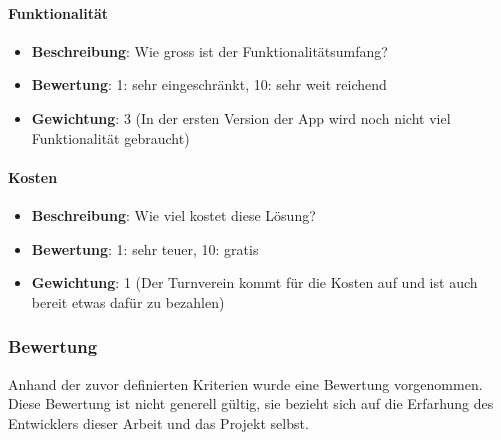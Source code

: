 \paragraph{Funktionalität}
\begin{itemize}
	\item \textbf{Beschreibung}: Wie gross ist der Funktionalitätsumfang? 
	\item \textbf{Bewertung}: 1: sehr eingeschränkt, 10: sehr weit reichend
	\item \textbf{Gewichtung}: 3 (In der ersten Version der App wird noch nicht viel Funktionalität gebraucht)
\end{itemize}

\paragraph{Kosten}
\begin{itemize}
	\item \textbf{Beschreibung}: Wie viel kostet diese Lösung? 
	\item \textbf{Bewertung}: 1: sehr teuer, 10: gratis
	\item \textbf{Gewichtung}: 1 (Der Turnverein kommt für die Kosten auf und ist auch bereit etwas dafür zu bezahlen)
\end{itemize}

\newpage
\subsubsection{Bewertung}\label{architektur_bewertung}
Anhand der zuvor definierten Kriterien wurde eine Bewertung vorgenommen. Diese Bewertung ist nicht generell gültig, sie bezieht sich auf die Erfarhung des Entwicklers dieser Arbeit und das Projekt selbst.

